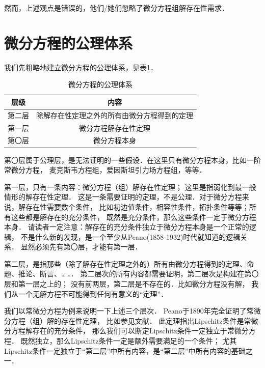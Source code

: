 然而，上述观点是错误的\cite{liu2018}，他们/她们忽略了微分方程组解存在性需求．

\section{微分方程的公理体系}

我们先粗略地建立微分方程的公理体系，见表\ref{chfd:tab-diff-axiom}．

\begin{table}[htb]
	\centering
	\caption{微分方程的公理体系} \label{chfd:tab-diff-axiom}
	\begin{tabular}{|*2{c|}}
		\hline
		层级 & 内容 \\ \hline
		第{\heiti 二}层 & 除解存在性定理之外的所有由微分方程得到的定理  \\ \hline
		第{\heiti 一}层 & 微分方程解存在性定理 \\ \hline
		第{\heiti 〇}层 & 微分方程本身   \\ \hline
	\end{tabular}
\end{table}



第〇层属于公理层，是无法证明的一些假设．在这里只有微分方程本身，比如一阶常微分方程，
麦克斯韦方程组，爱因斯坦引力场方程组，等等．

第一层，只有一条内容：微分方程（组）解存在性定理；
这里是指弱化到最一般情形的解存在性定理．
这是一条需要证明的定理，不是公理．对于微分方程来说，解存在性需要数个条件，
比如初边值条件，相容性条件，拓扑条件等等；所有这些都是解存在的充分条件，
既然是充分条件，那么这些条件一定于微分方程本身．
请读者一定注意：解存在的充分条件独立于微分方程本身是一个正常的逻辑，
不是什么新的发现，是一个至少从Peano(1858-1932)时代就知道的逻辑关系．
显然必须先有第〇层，才能有第一层．

第二层，是指那些（除了解存在性定理之外的）所有由微分方程得到的定理、命题、推论、断言、……．
第二层次的所有内容都需要证明，第二层次是构建在第〇层和第一层之上的；
没有前两层，第二层是不存在的．比如微分方程没有解，
我们从一个无解方程不可能得到任何有意义的“定理”．

我们以常微分方程为例来说明一下上述三个层次．
Peano于1890年完全证明了常微分方程（组）解的存在性定理，
比如参见文献\parencite[\S 31]{arnold-2001-ode}．
此定理指出Lipschitz条件是常微分方程解存在的充分条件，
那么我们可以断定Lipschitz条件一定独立于常微分方程．
既然独立，那么Lipschitz条件一定是额外需要满足的一个条件；
尤其Lipschitz条件一定独立于“第二层”中所有内容，是“第二层”中所有内容的基础之一．

